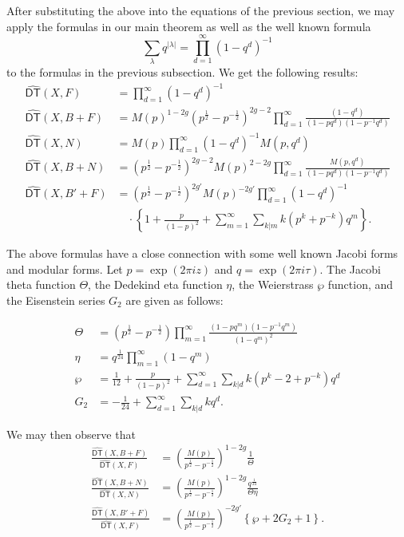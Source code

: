 \documentclass[12pt]{amsart}
\newcommand{\half}{\frac{1}{2}}
\theoremstyle{definition}
\newcommand{\DThat}{\operatorname{\widehat{\mathsf{DT}}}}
\begin{document}
After substituting the above into the equations of the previous
section, we may apply the formulas in our main theorem as well as the
well known formula
\[
\sum_{\lambda} q^{|\lambda |}= \prod_{d=1}^{\infty}(1-q^{d})^{-1}
\]
to the formulas in the previous subsection. We get the following
results:
\begin{align*}
\DThat (X,F)&= \prod_{d=1}^{\infty} (1-q^{d})^{-1}\\
\DThat (X,B+F)&= M(p)^{1-2g} \left(p^{\half}-p^{-\half} \right)^{2g-2} \prod_{d=1}^{\infty}
\frac{(1-q^{d})}{(1-pq^{d})(1-p^{-1}q^{d})}\\
\DThat (X,N) &= M(p)\prod_{d=1}^{\infty} (1-q^{d})^{-1} M(p,q^{d})\\
\DThat (X,B+N) &=  \left(p^{\half}-p^{-\half} \right)^{2g-2} M(p)^{2-2g}
\prod_{d=1}^{\infty} \frac{M(p,q^{d})}{(1-pq^{d})(1-p^{-1}q^{d})}\\
\DThat (X,B'+F) &=  \left(p^{\half}-p^{-\half}
\right)^{2g'}M(p)^{-2g'}\prod_{d=1}^{\infty}(1-q^{d})^{-1}\\
&\quad \cdot 
\left\{1+\frac{p}{(1-p)^{2}}+\sum_{m=1}^{\infty} \sum_{k|m}
k(p^{k}+p^{-k})q^{m} \right\}. 
\end{align*}

The above formulas have a close connection with some well known Jacobi
forms and modular forms. Let $p=\exp\left(2\pi iz \right)$ and
$q=\exp\left(2\pi i\tau \right)$. The Jacobi theta function $\Theta$,
the Dedekind eta function $\eta$, the Weierstrass $\wp$ function, and
the Eisenstein series $G_{2}$ are given as follows:

\begin{align*}
\Theta &= \left(p^{\half}-p^{-\half} \right) \prod_{m=1}^{\infty}
\frac{(1-pq^{m})(1-p^{-1}q^{m})}{(1-q^{m})^{2}}\\
\eta &= q^{\frac{1}{24}}\prod_{m=1}^{\infty}(1-q^{m})\\
\wp &= \frac{1}{12} +\frac{p}{(1-p)^{2}} +\sum_{d=1}^{\infty}
\sum_{k|d} k(p^{k}-2+p^{-k}) q^{d}\\
G_{2} &= -\frac{1}{24} + \sum_{d=1}^{\infty} \sum_{k|d} k q^{d}.
\end{align*}

We may then observe that 
\begin{align*}
\frac{\DThat (X,B+F)}{\DThat (X,F)} &= \left(\frac{M(p)}{p^{\half}-p^{-\half}}
\right)^{1-2g} \frac{1}{\Theta} \\
\frac{\DThat (X,B+N)}{\DThat (X,N)} &= \left(\frac{M(p)}{p^{\half}-p^{-\half}}
\right)^{1-2g} \frac{q^{\frac{1}{24}}}{\Theta \eta } \\
\frac{\DThat (X,B'+F)}{\DThat (X,F)} &= \left(\frac{M(p)}{p^{\half}-p^{-\half}}
\right)^{-2g'} \left\{\wp +2G_{2} +1 \right\}.
\end{align*}
\end{document}
